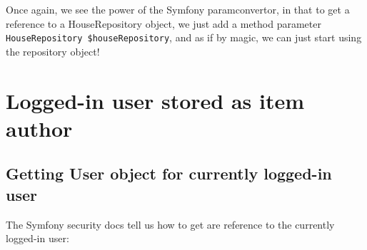 \documentclass[a4paperpaper,openright]{book}
\newenvironment{Shaded}{}{}
\newcommand{\AnnotationTok}[1]{\textcolor[rgb]{0.38,0.63,0.69}{\textbf{\textit{#1}}}}
\newcommand{\CommentTok}[1]{\textcolor[rgb]{0.38,0.63,0.69}{\textit{#1}}}
\newcommand{\KeywordTok}[1]{\textcolor[rgb]{0.00,0.44,0.13}{\textbf{#1}}}
\newcommand{\NormalTok}[1]{#1}
\newcommand{\OtherTok}[1]{\textcolor[rgb]{0.00,0.44,0.13}{#1}}
\newcommand{\StringTok}[1]{\textcolor[rgb]{0.25,0.44,0.63}{#1}}
\begin{document}
\begin{Shaded}
\end{Shaded}

Once again, we see the power of the Symfony paramconvertor, in that to
get a reference to a HouseRepository object, we just add a method
parameter \texttt{HouseRepository\ \$houseRepository}, and as if by
magic, we can just start using the repository object!

\hypertarget{logged-in-user-stored-as-item-author}{%
\chapter{Logged-in user stored as item
author}\label{logged-in-user-stored-as-item-author}}

\hypertarget{getting-user-object-for-currently-logged-in-user}{%
\section{Getting User object for currently logged-in
user}\label{getting-user-object-for-currently-logged-in-user}}

The Symfony security docs tell us how to get are reference to the
currently logged-in user:

\begin{Shaded}
\end{Shaded}
\end{document}
